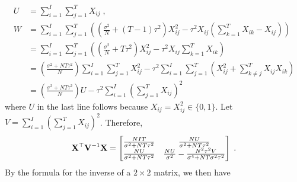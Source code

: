 \documentclass[10pt]{article}
\begin{document}
\begin{align*}
U & = \sum_{i=1}^I\sum_{j=1}^TX_{ij} \;, \\
W &= \sum_{i=1}^I\sum_{j=1}^T\left(\left(\frac{\sigma^2}{N}+(T-1)\tau^2\right)X_{ij}^2 -\tau^2X_{ij}\left(\sum_{k=1}^TX_{ik}-X_{ij}\right)\right) \\
&= \sum_{i=1}^I\sum_{j=1}^T\left(\left(\frac{\sigma^2}{N}+T\tau^2\right)X_{ij}^2 -\tau^2X_{ij}\sum_{k=1}^TX_{ik}\right) \\
&= \left(\frac{\sigma^2+NT\tau^2}{N}\right)\sum_{i=1}^I\sum_{j=1}^TX_{ij}^2 -\tau^2\sum_{i=1}^I\sum_{j=1}^T\left(X_{ij}^2+\sum_{k\neq j}^TX_{ij}X_{ik}\right) \\
&= \left(\frac{\sigma^2+NT\tau^2}{N}\right)U -\tau^2\sum_{i=1}^I\left(\sum_{j=1}^TX_{ij}\right)^2
\end{align*}
where $U$ in the last line follows because $X_{ij}=X_{ij}^2\in\{0,1\}$. Let $V = \sum_{i=1}^I\left(\sum_{j=1}^TX_{ij}\right)^2$. Therefore,
\[
\mathbf{X}^\top\mathbf{V}^{-1}\mathbf{X} =
\begin{bmatrix}
\frac{NIT}{\sigma^2+NT\tau^2} & \frac{NU}{\sigma^2+NT\tau^2} \\
\frac{NU}{\sigma^2+NT\tau^2} & \frac{NU}{\sigma^2} - \frac{N^2\tau^2V}{\sigma^4+NT\sigma^2\tau^2}
\end{bmatrix} \;.
\]
By the formula for the inverse of a $2\times 2$ matrix, we then have
\end{document}
